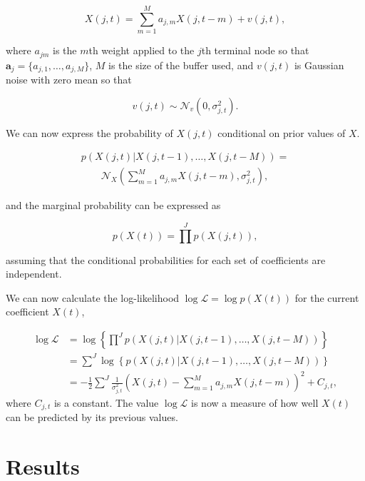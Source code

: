 \begin{equation}\label{eq:lpm}
X(j,t) = \sum_{m=1}^{M} a_{j,m} X(j,t - m) + v(j,t),
\end{equation}

where $a_{jm}$ is the $m$th weight applied to the $j$th terminal node so that $\mathbf{a}_j = \{a_{j,1}, \ldots, a_{j,M} \}$, $M$ is the size of the buffer used, and $v(j,t)$ is Gaussian noise with zero mean so that

\begin{equation}\label{eq:lpmnoise}
v(j,t) \sim \mathcal{N}_v(0,\sigma^2_{j,t}).
\end{equation}

We can now express the probability of $X(j,t)$ conditional on prior values of $X$.

\begin{align}\label{eq:likelihood}
p\left(X\left(j,t\right)|X\left(j,t-1\right),\ldots,X\left(j,t-M\right)\right) = \nonumber\\
\qquad \mathcal{N}_X\left( \sum_{m=1}^M a_{j,m} X(j,t - m), \sigma_{j,t}^2\right),
\end{align}

and the marginal probability can be expressed as

\begin{equation}\label{eq:marginal}
p\left(X(t)\right) = \prod^J p\left(X(j,t)\right),
\end{equation}

assuming that the conditional probabilities for each set of coefficients are independent.

We can now calculate the log-likelihood $\log\mathcal{L} = \log{p\left(X(t)\right)}$ for the current coefficient $X(t)$,

\begin{align}\label{eq:loglike}
\log \mathcal{L} &= \log \left\{ \prod^J p \left( X(j,t) | X(j,t-1),\ldots,X(j,t-M) \right) \right\} \\
&=  \sum^J \log \left\{p \left( X(j,t) | X(j,t-1),\ldots,X(j,t-M) \right) \right\}\nonumber\\
&=  -\frac{1}{2} \sum^J \frac{1}{\sigma_{j,t}^2}\left(X(j,t) -  \sum_{m=1}^{M} a_{j,m} X(j,t - m) \right)^2 + C_{j,t}\nonumber,
\end{align}
where $C_{j,t}$ is a constant. The value $\log \mathcal{L}$ is now a measure of how well $X(t)$ can be predicted by its previous values.

\section{Results}
